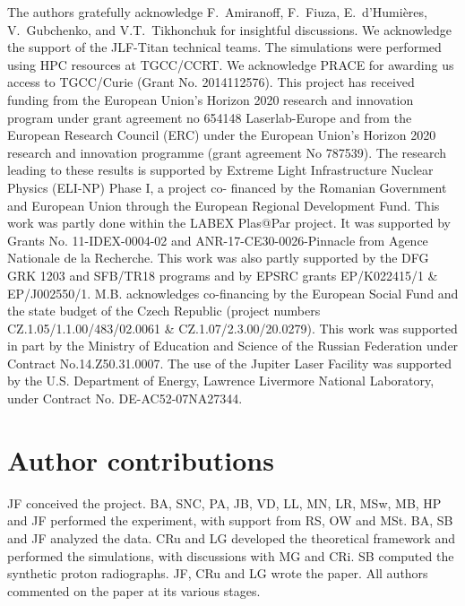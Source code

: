 \documentclass[aps,twocolumn,showpacs,superscriptaddress]{revtex4}
\begin{document}
\begin{acknowledgments}
The authors gratefully acknowledge F.~Amiranoff, F.~Fiuza, E.~d'Humi\`eres, V.~Gubchenko, and V.T.~Tikhonchuk for insightful discussions.
We acknowledge the support of the JLF-Titan technical teams.
The simulations were performed using HPC resources at TGCC/CCRT. We acknowledge PRACE for awarding us access to TGCC/Curie (Grant No. 2014112576).
This project has received funding from the European Union’s Horizon 2020 research and innovation program under grant agreement no 654148 Laserlab-Europe and from the European Research Council (ERC) under the European Union’s Horizon 2020 research and innovation programme (grant agreement No 787539).
The research leading to these results is supported by Extreme Light Infrastructure Nuclear Physics (ELI-NP) Phase I, a project co- financed by the Romanian Government and European Union through the European Regional Development Fund. This work was partly done within the LABEX Plas@Par project. It was supported by Grants No. 11-IDEX-0004-02 and ANR-17-CE30-0026-Pinnacle from Agence Nationale de la Recherche. This work was also partly supported by the DFG GRK 1203 and SFB/TR18 programs and by EPSRC grants EP/K022415/1 \& EP/J002550/1. M.B. acknowledges co-financing by the European Social Fund and the state budget of the Czech Republic (project numbers CZ.1.05/1.1.00/483/02.0061 \& CZ.1.07/2.3.00/20.0279). 
This work was supported in part by the Ministry of Education and Science of the Russian Federation under Contract No.14.Z50.31.0007.
The use of the Jupiter Laser Facility  was supported by the U.S. Department of Energy, Lawrence Livermore  National Laboratory, under Contract No. DE-AC52-07NA27344.
\end{acknowledgments}

\section*{Author contributions}
JF conceived the project. BA, SNC, PA, JB, VD, LL, MN, LR, MSw, MB, HP and JF performed the experiment, with support from RS, OW and MSt.  BA, SB and JF analyzed the data. CRu and LG developed the theoretical framework and performed the simulations, with discussions with MG and CRi. SB computed the synthetic proton radiographs. JF, CRu and LG wrote the paper. All authors commented on the paper at its various stages.
\end{document}
